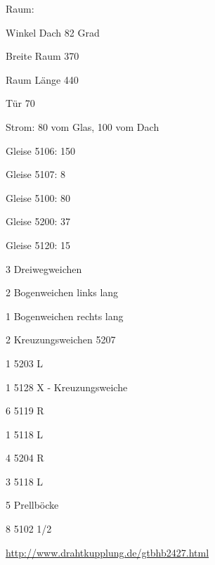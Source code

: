\documentclass{article}
\begin{document}
\newpage
\makeatletter

\TrackUse

\newpage

Raum: 

Winkel Dach 82 Grad

Breite Raum 370

Raum Länge 440

Tür 70

Strom: 80 vom Glas, 100 vom Dach

Gleise 5106: 150

Gleise 5107: 8 

Gleise 5100: 80

Gleise 5200: 37

Gleise 5120: 15

3 Dreiwegweichen

2 Bogenweichen links lang

1 Bogenweichen rechts lang

2 Kreuzungsweichen 5207

1 5203 L

1 5128 X - Kreuzungsweiche

6 5119 R

1 5118 L

4 5204 R

3 5118 L

5 Prellböcke

8 5102 1/2

\url{http://www.drahtkupplung.de/gtbhb2427.html}

\newpage
% 
% 
% 
\newpage
{}
\end{document}
